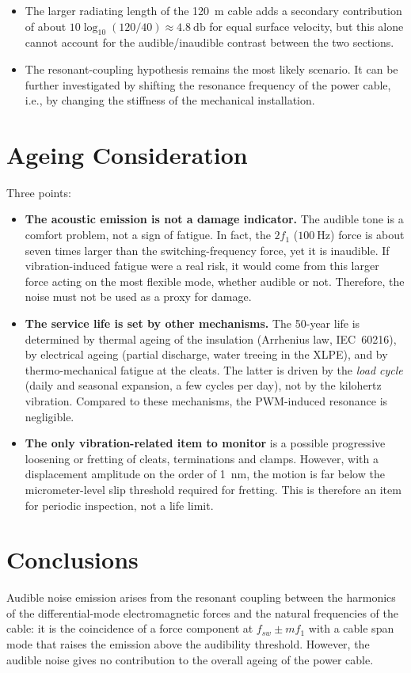 \documentclass[11pt,a4paper,oneside]{book}
\begin{document}
\begin{onehalfspace}
\begin{itemize}
{	section does not.}
	\item[--] The larger radiating length of the \SI{120}{\meter} cable adds a
	secondary contribution of about $10\log_{10}(120/40)\approx\SI{4.8}{\decibel}$
	for equal surface velocity, but this alone cannot account for the
	audible/inaudible contrast between the two sections.
	\item[--] The resonant-coupling hypothesis remains the most likely scenario. It can be further investigated by shifting the resonance frequency of the power cable, i.e., by changing the stiffness of the mechanical installation.
   \end{itemize}

\section{Ageing Consideration} Three points:
\begin{itemize}[leftmargin=*]
	\item[--] \textbf{The acoustic emission is not a damage indicator.} The audible
	tone is a comfort problem, not a sign of fatigue. In fact, the $2f_1$
	($\SI{100}{\hertz}$) force is about seven times larger than the
	switching-frequency force, yet it is inaudible. If vibration-induced fatigue
	were a real risk, it would come from this larger force acting on the most
	flexible mode, whether audible or not. Therefore, the noise must not be used
	as a proxy for damage.
	\item[--] \textbf{The service life is set by other mechanisms.} The
	\num{50}-year life is determined by thermal ageing of the insulation
	(Arrhenius law, IEC~60216), by electrical ageing (partial discharge, water
	treeing in the XLPE), and by thermo-mechanical fatigue at the cleats. The
	latter is driven by the \emph{load cycle} (daily and seasonal expansion, a few
	cycles per day), not by the kilohertz vibration. Compared to these mechanisms,
	the PWM-induced resonance is negligible.
	\item[--] \textbf{The only vibration-related item to monitor} is a possible
	progressive loosening or fretting of cleats, terminations and clamps. However,
	with a displacement amplitude on the order of \SI{1}{\nano\meter}, the motion
	is far below the micrometer-level slip threshold required for fretting. This
	is therefore an item for periodic inspection, not a life limit.
\end{itemize}

\section{Conclusions}
Audible noise emission arises from the resonant coupling between the harmonics of the differential-mode electromagnetic forces and the natural frequencies of the cable: it is the coincidence of a force component at  $ f_{sw} \pm m f_1 $ with a cable span mode that raises the emission above the audibility threshold. However, the audible noise gives no contribution to the overall ageing of the power cable.


\end{onehalfspace}
\end{document}
